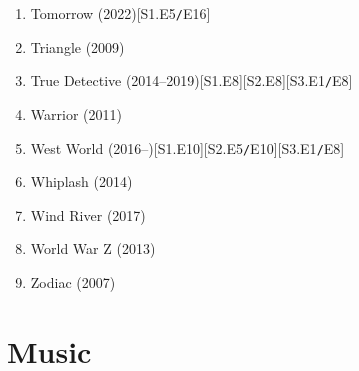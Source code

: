 \documentclass{article}
\begin{document}
\begin{enumerate}
	\item Tomorrow (2022)\hfill[S1.E5{\tt/}E16]
	\item {\sc Triangle} (2009)
	\item True Detective (2014--2019)\hfill[S1.E8][S2.E8][S3.E1{\tt/}E8]
	\item {\sc Warrior} (2011)
	\item West World (2016--)\hfill[S1.E10][S2.E5{\tt/}E10][S3.E1{\tt/}E8]
	\item {\sc Whiplash} (2014)
	\item {\sc Wind River} (2017)
	\item {\sc World War Z} (2013)
	\item {\sc Zodiac} (2007)
\end{enumerate}


\section{Music}
\end{document}

